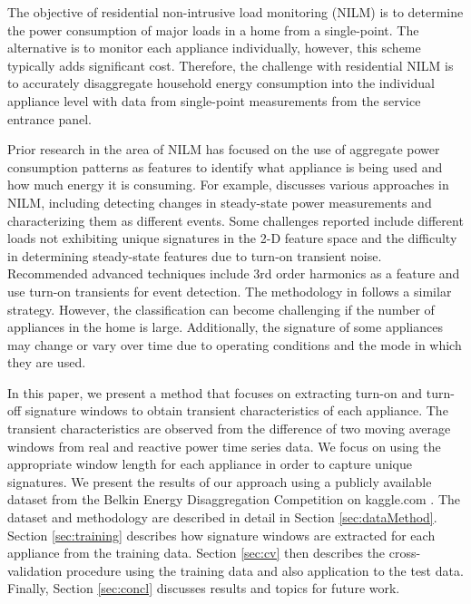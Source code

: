 \documentclass[conference]{IEEEtran}
\begin{document}
The objective of residential non-intrusive load monitoring (NILM) is to determine the power consumption of major loads in a home from a single-point.  The alternative is to monitor each appliance individually, however, this scheme typically adds significant cost. Therefore, the challenge with residential NILM is to accurately disaggregate household energy consumption into the individual appliance level with data from single-point measurements from the service entrance panel.  

Prior research in the area of NILM has focused on the use of aggregate power consumption patterns as features to identify what appliance is being used and how much energy it is consuming. For example, \cite{mit} discusses various approaches in NILM, including detecting changes in steady-state power measurements and characterizing them as different events. Some challenges reported include different loads not exhibiting unique signatures in the 2-D feature space and the difficulty in determining steady-state features due to turn-on transient noise.  Recommended advanced techniques include 3rd order harmonics as a feature and use turn-on transients for event detection.  The methodology in \cite{adaptive, EMI, prob, Hart, Shaw, Lin, Wave} follows a similar strategy.  However, the classification can become challenging if the number of appliances in the home is large. Additionally, the signature of some appliances may change or vary over time due to operating conditions and the mode in which they are used. 

In this paper, we present a method that focuses on extracting turn-on and turn-off signature windows to obtain transient characteristics of each appliance.  The transient characteristics are observed from the difference of two moving average windows from real and reactive power time series data.  We focus on using the appropriate window length for each appliance in order to capture unique signatures.  We present the results of our approach using a publicly available dataset from the Belkin Energy Disaggregation Competition on kaggle.com \cite{Kaggle}. The dataset and methodology are described in detail in Section \ref{sec:dataMethod}.  Section \ref{sec:training} describes how signature windows are extracted for each appliance from the training data. Section \ref{sec:cv} then describes the cross-validation procedure using the training data and also application to the test data. Finally, Section \ref{sec:concl} discusses results and topics for future work.

\end{document}
